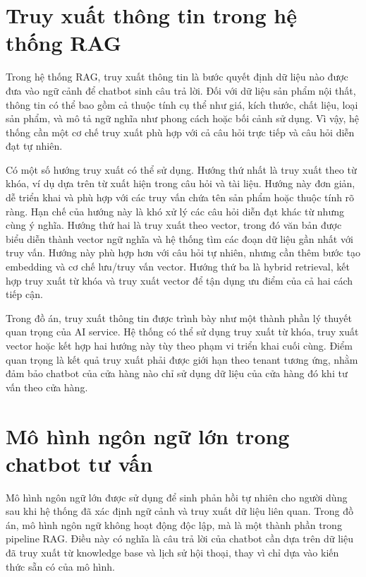 \documentclass[../DoAn.tex]{subfiles}
\begin{document}
\section{Truy xuất thông tin trong hệ thống RAG}
\label{section:3.3}

Trong hệ thống RAG, truy xuất thông tin là bước quyết định dữ liệu nào được đưa vào ngữ cảnh để chatbot sinh câu trả lời. Đối với dữ liệu sản phẩm nội thất, thông tin có thể bao gồm cả thuộc tính cụ thể như giá, kích thước, chất liệu, loại sản phẩm, và mô tả ngữ nghĩa như phong cách hoặc bối cảnh sử dụng. Vì vậy, hệ thống cần một cơ chế truy xuất phù hợp với cả câu hỏi trực tiếp và câu hỏi diễn đạt tự nhiên.

Có một số hướng truy xuất có thể sử dụng. Hướng thứ nhất là truy xuất theo từ khóa, ví dụ dựa trên từ xuất hiện trong câu hỏi và tài liệu. Hướng này đơn giản, dễ triển khai và phù hợp với các truy vấn chứa tên sản phẩm hoặc thuộc tính rõ ràng. Hạn chế của hướng này là khó xử lý các câu hỏi diễn đạt khác từ nhưng cùng ý nghĩa. Hướng thứ hai là truy xuất theo vector, trong đó văn bản được biểu diễn thành vector ngữ nghĩa và hệ thống tìm các đoạn dữ liệu gần nhất với truy vấn. Hướng này phù hợp hơn với câu hỏi tự nhiên, nhưng cần thêm bước tạo embedding và cơ chế lưu/truy vấn vector. Hướng thứ ba là hybrid retrieval, kết hợp truy xuất từ khóa và truy xuất vector để tận dụng ưu điểm của cả hai cách tiếp cận.

Trong đồ án, truy xuất thông tin được trình bày như một thành phần lý thuyết quan trọng của AI service. Hệ thống có thể sử dụng truy xuất từ khóa, truy xuất vector hoặc kết hợp hai hướng này tùy theo phạm vi triển khai cuối cùng. Điểm quan trọng là kết quả truy xuất phải được giới hạn theo tenant tương ứng, nhằm đảm bảo chatbot của cửa hàng nào chỉ sử dụng dữ liệu của cửa hàng đó khi tư vấn theo cửa hàng.

\section{Mô hình ngôn ngữ lớn trong chatbot tư vấn}
\label{section:3.4}

Mô hình ngôn ngữ lớn được sử dụng để sinh phản hồi tự nhiên cho người dùng sau khi hệ thống đã xác định ngữ cảnh và truy xuất dữ liệu liên quan. Trong đồ án, mô hình ngôn ngữ không hoạt động độc lập, mà là một thành phần trong pipeline RAG. Điều này có nghĩa là câu trả lời của chatbot cần dựa trên dữ liệu đã truy xuất từ knowledge base và lịch sử hội thoại, thay vì chỉ dựa vào kiến thức sẵn có của mô hình.
\end{document}
